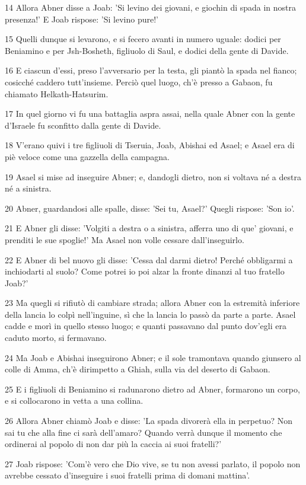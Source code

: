 \par 14 Allora Abner disse a Joab: 'Si levino dei giovani, e giochin di spada in nostra presenza!' E Joab rispose: 'Si levino pure!'
\par 15 Quelli dunque si levarono, e si fecero avanti in numero uguale: dodici per Beniamino e per Jsh-Bosheth, figliuolo di Saul, e dodici della gente di Davide.
\par 16 E ciascun d'essi, preso l'avversario per la testa, gli piantò la spada nel fianco; cosicché caddero tutt'insieme. Perciò quel luogo, ch'è presso a Gabaon, fu chiamato Helkath-Hatsurim.
\par 17 In quel giorno vi fu una battaglia aspra assai, nella quale Abner con la gente d'Israele fu sconfitto dalla gente di Davide.
\par 18 V'erano quivi i tre figliuoli di Tseruia, Joab, Abishai ed Asael; e Asael era di piè veloce come una gazzella della campagna.
\par 19 Asael si mise ad inseguire Abner; e, dandogli dietro, non si voltava né a destra né a sinistra.
\par 20 Abner, guardandosi alle spalle, disse: 'Sei tu, Asael?' Quegli rispose: 'Son io'.
\par 21 E Abner gli disse: 'Volgiti a destra o a sinistra, afferra uno di que' giovani, e prenditi le sue spoglie!' Ma Asael non volle cessare dall'inseguirlo.
\par 22 E Abner di bel nuovo gli disse: 'Cessa dal darmi dietro! Perché obbligarmi a inchiodarti al suolo? Come potrei io poi alzar la fronte dinanzi al tuo fratello Joab?'
\par 23 Ma quegli si rifiutò di cambiare strada; allora Abner con la estremità inferiore della lancia lo colpì nell'inguine, sì che la lancia lo passò da parte a parte. Asael cadde e morì in quello stesso luogo; e quanti passavano dal punto dov'egli era caduto morto, si fermavano.
\par 24 Ma Joab e Abishai inseguirono Abner; e il sole tramontava quando giunsero al colle di Amma, ch'è dirimpetto a Ghiah, sulla via del deserto di Gabaon.
\par 25 E i figliuoli di Beniamino si radunarono dietro ad Abner, formarono un corpo, e si collocarono in vetta a una collina.
\par 26 Allora Abner chiamò Joab e disse: 'La spada divorerà ella in perpetuo? Non sai tu che alla fine ci sarà dell'amaro? Quando verrà dunque il momento che ordinerai al popolo di non dar più la caccia ai suoi fratelli?'
\par 27 Joab rispose: 'Com'è vero che Dio vive, se tu non avessi parlato, il popolo non avrebbe cessato d'inseguire i suoi fratelli prima di domani mattina'.
